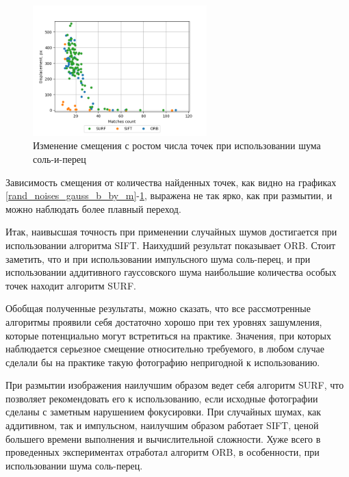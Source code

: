 {	\begin{figure}[H]
		\centering                             
		\includegraphics[width=0.6\textwidth,keepaspectratio]{ex2/sp/Rand_noises_d_by_m.png}      
		\centering\caption{  Изменение смещения с ростом числа точек при использовании шума соль-и-перец}
		\label{rand_noises_sp_b_by_m}                           
	\end{figure} 
	
	Зависимость смещения от количества найденных точек, как видно на графиках \ref{rand_noises_gauss_b_by_m}-\ref{rand_noises_sp_b_by_m}, выражена не так ярко, как при размытии, и можно наблюдать более плавный переход.
	
	Итак, наивысшая точность при применении случайных шумов достигается при использовании алгоритма SIFT. Наихудший результат показывает ORB. Стоит заметить, что и при использовании импульсного шума соль-перец, и при использовании аддитивного гауссовского шума наибольшие количества особых точек находит алгоритм SURF.
	
	Обобщая полученные результаты, можно сказать, что все рассмотренные алгоритмы проявили себя достаточно хорошо при тех уровнях зашумления, которые потенциально могут встретиться на практике. Значения, при которых наблюдается серьезное смещение относительно требуемого, в любом случае сделали бы на практике такую фотографию непригодной к использованию. 
	
	При размытии изображения наилучшим образом ведет себя алгоритм SURF, что позволяет рекомендовать его к использованию, если исходные фотографии сделаны с заметным нарушением фокусировки.
	При случайных шумах, как аддитивном, так и импульсном, наилучшим образом работает SIFT, ценой большего времени выполнения и вычислительной сложности. 
	Хуже всего в проведенных экспериментах отработал алгоритм ORB, в особенности, при использовании шума соль-перец.
}
\newpage



